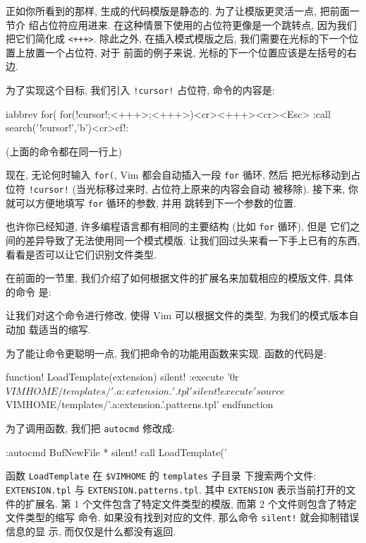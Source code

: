 正如你所看到的那样, 生成的代码模版是静态的. 为了让模版更灵活一点, 把前面一节介
绍占位符应用进来.
在这种情景下使用的占位符更像是一个跳转点, 因为我们把它们简化成 \texttt{<+++>}.
除此之外, 在插入模式模版之后, 我们需要在光标的下一个位置上放置一个占位符, 对于
前面的例子来说, 光标的下一个位置应该是左括号的右边.

为了实现这个目标, 我们引入 \texttt{!cursor!} 占位符, 命令的内容是:
\begin{vimcmd}
iabbrev for( for(!cursor!;<+++>;<+++>){<cr><+++><cr>}<Esc>
    :call search('!cursor!','b')<cr>cf!:
\end{vimcmd}
(上面的命令都在同一行上)

现在, 无论何时输入 \texttt{for(}, Vim 都会自动插入一段 \texttt{for} 循环, 然后 
把光标移动到占位符 \texttt{!cursor!} (当光标移过来时, 占位符上原来的内容会自动
被移除). 接下来, 你就可以方便地填写 \texttt{for} 循环的参数, 并用 
跳转到下一个参数的位置.

也许你已经知道, 许多编程语言都有相同的主要结构 (比如 \texttt{for} 循环), 但是 
它们之间的差异导致了无法使用同一个模式模版. 让我们回过头来看一下手上已有的东西,
看看是否可以让它们识别文件类型.

在前面的一节里, 我们介绍了如何根据文件的扩展名来加载相应的模版文件, 具体的命令
是:
让我们对这个命令进行修改, 使得 Vim 可以根据文件的类型, 为我们的模式版本自动加
载适当的缩写.

为了能让命令更聪明一点, 我们把命令的功能用函数来实现. 函数的代码是:
\begin{vimcmd}
function! LoadTemplate(extension)
    silent! :execute '0r $VIMHOME/templates/'. a:extension. '.tpl'
    silent! execute 'source $VIMHOME/templates/'.a:extension.'.patterns.tpl'
endfunction
\end{vimcmd}
为了调用函数, 我们把 \texttt{autocmd} 修改成:
\begin{vimcmd}
:autocmd BufNewFile * silent! call LoadTemplate('%
\end{vimcmd}
函数 \texttt{LoadTemplate} 在 \texttt{\$VIMHOME} 的 \texttt{templates} 子目录
下搜索两个文件: \texttt{EXTENSION.tpl} 与 \texttt{EXTENSION.patterns.tpl}.
其中 \texttt{EXTENSION} 表示当前打开的文件的扩展名.
第 1 个文件包含了特定文件类型的模版, 而第 2 个文件则包含了特定文件类型的缩写
命令. 如果没有找到对应的文件, 那么命令 \texttt{silent!} 就会抑制错误信息的显
示, 而仅仅是什么都没有返回.

